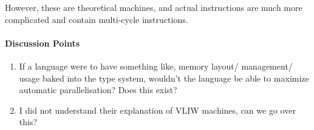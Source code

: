 However, these are theoretical machines, and actual instructions are much more
complicated and contain multi-cycle instructions.

\paragraph{\textbf{Discussion Points}}
\begin{enumerate}
    \item If a language were to have something like, memory layout/ management/
    usage baked into the type system, wouldn't the language be able to maximize
    automatic parallelisation? Does this exist?
    \item I did not understand their explanation of VLIW machines, can we go
    over this?
\end{enumerate}